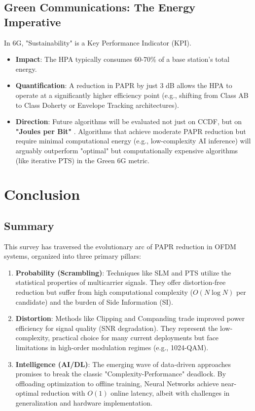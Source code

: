 \documentclass[conference]{IEEEtran}
\begin{document}
\subsection{Green Communications: The Energy Imperative}
In 6G, "Sustainability" is a Key Performance Indicator (KPI).

\begin{itemize}
    \item \textbf{Impact}: The HPA typically consumes 60-70\% of a base station's total energy.
    \item \textbf{Quantification}: A reduction in PAPR by just 3 dB allows the HPA to operate at a significantly higher efficiency point (e.g., shifting from Class AB to Class Doherty or Envelope Tracking architectures).
    \item \textbf{Direction}: Future algorithms will be evaluated not just on CCDF, but on \textbf{"Joules per Bit"} \cite{ref14}. Algorithms that achieve moderate PAPR reduction but require minimal computational energy (e.g., low-complexity AI inference) will arguably outperform "optimal" but computationally expensive algorithms (like iterative PTS) in the Green 6G metric.
\end{itemize}

\section{Conclusion}

\subsection{Summary}
This survey has traversed the evolutionary arc of PAPR reduction in OFDM systems, organized into three primary pillars:

\begin{enumerate}
    \item \textbf{Probability (Scrambling)}: Techniques like SLM and PTS utilize the statistical properties of multicarrier signals. They offer distortion-free reduction but suffer from high computational complexity ($O(N \log N)$ per candidate) and the burden of Side Information (SI).
    \item \textbf{Distortion}: Methods like Clipping and Companding trade improved power efficiency for signal quality (SNR degradation). They represent the low-complexity, practical choice for many current deployments but face limitations in high-order modulation regimes (e.g., 1024-QAM).
    \item \textbf{Intelligence (AI/DL)}: The emerging wave of data-driven approaches promises to break the classic "Complexity-Performance" deadlock. By offloading optimization to offline training, Neural Networks achieve near-optimal reduction with $O(1)$ online latency, albeit with challenges in generalization and hardware implementation.
\end{enumerate}
\end{document}
